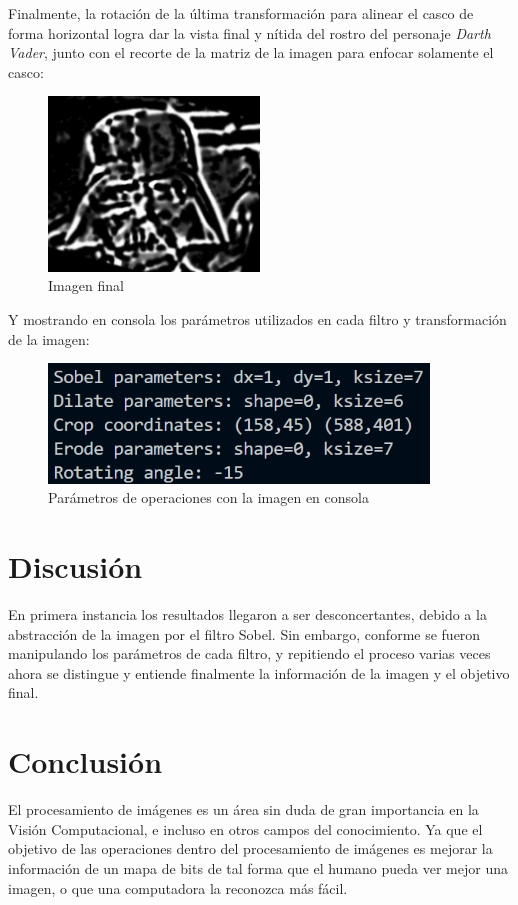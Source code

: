 \documentclass[12pt, a4paper]{article}
\begin{document}
Finalmente, la rotación de la última transformación para alinear el casco de forma horizontal logra dar la vista final y nítida del rostro del personaje \emph{Darth Vader}, junto con el recorte de la matriz de la imagen para enfocar solamente el casco:

\begin{figure}[!ht]
    \centering
    \includegraphics[width=0.5\textwidth]{img/res.png}
    \caption{Imagen final}
\end{figure}

Y mostrando en consola los parámetros utilizados en cada filtro y transformación de la imagen:

\begin{figure}[!ht]
    \centering
    \includegraphics[width=0.9\textwidth]{img/res-parameters.png}
    \caption{Parámetros de operaciones con la imagen en consola}
\end{figure}

\section{Discusión}
En primera instancia los resultados llegaron a ser desconcertantes, debido a la abstracción de la imagen por el filtro Sobel. Sin embargo, conforme se fueron manipulando los parámetros de cada filtro, y repitiendo el proceso varias veces ahora se distingue y entiende finalmente la información de la imagen y el objetivo final.

\section{Conclusión}
El procesamiento de imágenes es un área sin duda de gran importancia en la Visión Computacional, e incluso en otros campos del conocimiento. Ya que el objetivo de las operaciones dentro del procesamiento de imágenes es mejorar la información de un mapa de bits de tal forma que el humano pueda ver mejor una imagen, o que una computadora la reconozca más fácil.



\nocite{*}
\end{document}
